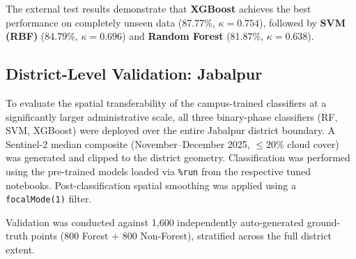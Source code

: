 \documentclass[12pt, a4paper, twocolumn]{article}
\begin{document}
\begin{table}[H]
\centering
\caption{External validation results on unseen test area (240 per class).}
\label{tab:external}
\end{table}

The external test results demonstrate that \textbf{XGBoost} achieves the best performance on completely unseen data (87.77\%, $\kappa=0.754$), followed by \textbf{SVM (RBF)} (84.79\%, $\kappa=0.696$) and \textbf{Random Forest} (81.87\%, $\kappa=0.638$).

\subsection{District-Level Validation: Jabalpur}
\label{subsec:jbp_results}

To evaluate the spatial transferability of the campus-trained classifiers at a significantly larger administrative scale, all three binary-phase classifiers (RF, SVM, XGBoost) were deployed over the entire Jabalpur district boundary.
A Sentinel-2 median composite (November--December 2025, $\leq 20\%$ cloud cover) was generated and clipped to the district geometry.
Classification was performed using the pre-trained models loaded via \texttt{\%run} from the respective tuned notebooks.
Post-classification spatial smoothing was applied using a \texttt{focalMode(1)} filter.

Validation was conducted against 1,600 independently auto-generated ground-truth points (800 Forest + 800 Non-Forest), stratified across the full district extent.

\begin{table}[H]
\centering
\caption{Jabalpur district-level validation results (800 per class, $N = 1{,}600$).}
\label{tab:jbp_results}
\end{table}
\end{document}
